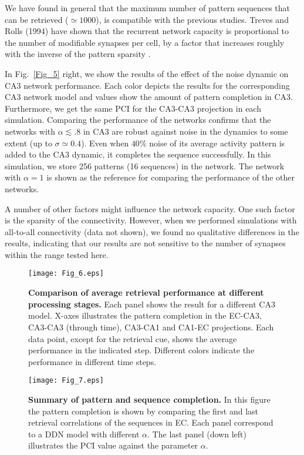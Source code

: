 \documentclass[utf8]{frontiersSCNS} %
\begin{document}
We have found in general that the maximum number of pattern sequences that can be retrieved ($\simeq 1000$), is compatible with the previous studies. Treves and Rolls (1994) have shown that the recurrent network capacity is proportional to the number of modifiable synapses per cell, by a factor that increases roughly with the inverse of the pattern sparsity \citep{treves1994computational}. 
%

In Fig.~\ref{Fig_5} right, we show the results of the effect of the noise dynamic on CA3 network performance. Each color depicts the results for the corresponding CA3 network model and values show the amount of pattern completion in CA3.
Furthermore, we get the same PCI for the CA3-CA3 projection in each simulation.
Comparing the performance of the networks confirms that the networks with $\alpha \lesssim .8$ in CA3 are robust against noise in the dynamics to some extent (up to $\sigma \simeq 0.4$). Even when $ 40 \% $ noise of its average activity pattern is added to the CA3 dynamic, it completes the sequence successfully. In this simulation, we store 256 patterns (16 sequences) in the network. The network with $\alpha = 1$ is shown as the reference for comparing the performance of the other networks.    

A number of other factors might influence the network capacity. One such factor is the sparsity of the connectivity. However, when we performed simulations with all-to-all connectivity (data not shown), we found no qualitative differences in the results, indicating that our results are not sensitive to the number of synapses within the range tested here. 

\begin{figure}[!htb]
\centering\texttt{[image: Fig\_6.eps]}
\caption{\textbf{Comparison of average retrieval performance at different processing stages.}
Each panel shows the result for a different CA3 model. X-axes illustrates the pattern completion in the EC-CA3, CA3-CA3 (through time), CA3-CA1 and CA1-EC projections. Each data point, except for the retrieval cue, shows the average performance in the indicated step. Different colors indicate the performance in different time steps.}
\label{Fig_6}
\end{figure}

\begin{figure}[!htb]
\centering\texttt{[image: Fig\_7.eps]}
\caption{\textbf{Summary of pattern and sequence completion.} In this figure the pattern completion is shown by comparing the first and last retrieval correlations of the sequences in EC. Each panel correspond to a  DDN model with different $\alpha$. The last panel (down left) illustrates the PCI value against the parameter $\alpha$.}
\label{Fig_7}
\end{figure}
\end{document}

